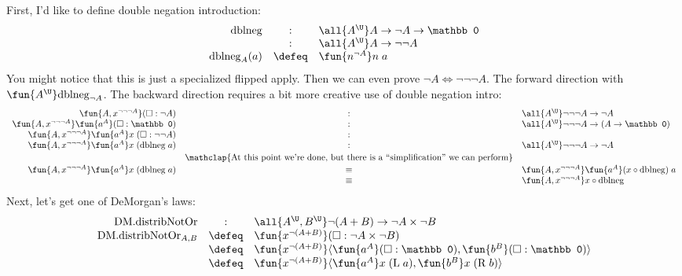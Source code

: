 \documentclass[11pt]{article} %
\theoremstyle{definition}
\theoremstyle{remark}
\begin{document}
First, I'd like to define double negation introduction:
\[\begin{array}{rcl}
  \mathrm{dblneg} & : & \all{A^\U} A \to \lnot A \to \mathbb 0 \\
                  & : & \all{A^\U} A \to \lnot\lnot A \\
  \mathrm{dblneg}_{A}(a) & \defeq & \fun{n^{\lnot A}} n\;a \\
\end{array}\]
You might notice that this is just a specialized flipped apply.
Then we can even prove $\lnot A \Leftrightarrow \lnot\lnot\lnot A$.
The forward direction with $\fun{A^\U} \mathrm{dblneg}_{\lnot A}$.
The backward direction requires a bit more creative use of double negation intro:
\[\begin{array}{rcl}
  \fun{A,x^{\lnot\lnot\lnot A}} (\square : \lnot A) & : & \all{A^\U} \lnot\lnot\lnot A \to \lnot A \\
  \fun{A,x^{\lnot\lnot\lnot A}} \fun{a^A} (\square : \mathbb 0) & : & \all{A^\U} \lnot\lnot\lnot A \to (A \to \mathbb 0) \\
  \fun{A,x^{\lnot\lnot\lnot A}} \fun{a^A} x\;(\square : \lnot\lnot A) & : \\
  \fun{A,x^{\lnot\lnot\lnot A}} \fun{a^A} x\;(\mathrm{dblneg}\;a) & : & \all{A^\U} \lnot\lnot\lnot A \to \lnot A \\
\\[-1em] & \mathclap{\text{At this point we're done, but there is a ``simplification'' we can perform}} \\[-1em]\\
  \fun{A,x^{\lnot\lnot\lnot A}} \fun{a^A} x\;(\mathrm{dblneg}\;a)
    & \equiv & \fun{A,x^{\lnot\lnot\lnot A}} \fun{a^A} (x \circ \mathrm{dblneg})\;a \\
    & \equiv & \fun{A,x^{\lnot\lnot\lnot A}} x \circ \mathrm{dblneg}
\end{array}\]
Next, let's get one of DeMorgan's laws:
\[\begin{array}{rcl}
  \mathrm{DM.distribNotOr} & : & \all{A^\U,B^\U}\lnot(A + B) \to \lnot A \times \lnot B \\
  \mathrm{DM.distribNotOr}_{A,B} & \defeq & \fun{x^{\lnot(A+B)}} (\square : \lnot A \times \lnot B) \\
    & \defeq & \fun{x^{\lnot(A+B)}} \langle\fun{a^A} (\square : \mathbb 0), \fun{b^B} (\square : \mathbb 0)\rangle \\
    & \defeq & \fun{x^{\lnot(A+B)}} \langle\fun{a^A} x\;(\mathrm{L}\;a), \fun{b^B} x\;(\mathrm{R}\;b)\rangle \\
\end{array}\]
\end{document}
